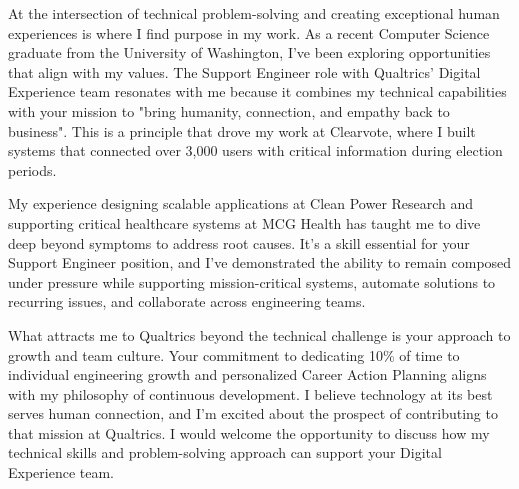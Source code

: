 At the intersection of technical problem-solving and creating exceptional human experiences is where I find purpose in my work. As a recent Computer Science graduate from the University of Washington, I've been exploring opportunities that align with my values. The Support Engineer role with Qualtrics' Digital Experience team resonates with me because it combines my technical capabilities with your mission to "bring humanity, connection, and empathy back to business". This is a principle that drove my work at Clearvote, where I built systems that connected over 3,000 users with critical information during election periods.

My experience designing scalable applications at Clean Power Research and supporting critical healthcare systems at MCG Health has taught me to dive deep beyond symptoms to address root causes. It's a skill essential for your Support Engineer position, and I've demonstrated the ability to remain composed under pressure while supporting mission-critical systems, automate solutions to recurring issues, and collaborate across engineering teams.

What attracts me to Qualtrics beyond the technical challenge is your approach to growth and team culture. Your commitment to dedicating 10\% of time to individual engineering growth and personalized Career Action Planning aligns with my philosophy of continuous development. I believe technology at its best serves human connection, and I'm excited about the prospect of contributing to that mission at Qualtrics. I would welcome the opportunity to discuss how my technical skills and problem-solving approach can support your Digital Experience team.
